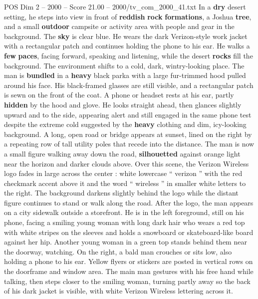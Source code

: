 \begin{textsample}{POS Dim 2 – 2000 – Score 21.00 – 2000/tv\_com\_2000\_41.txt}
In a \textbf{dry} desert setting, he steps into view in front of \textbf{reddish} \textbf{rock} \textbf{formations}, a Joshua \textbf{tree}, and a small \textbf{outdoor} campsite or activity area with people and gear in the background.
The \textbf{sky} is clear blue.
He wears the dark Verizon-style work jacket with a rectangular patch and continues holding the phone to his ear.
He walks a \textbf{few} \textbf{paces}, facing forward, speaking and listening, while the desert \textbf{rocks} fill the background.
The environment shifts to a cold, dark, wintry-looking place.
The man is \textbf{bundled} in a \textbf{heavy} black parka with a large fur-trimmed hood pulled around his face.
His black-framed glasses are still visible, and a rectangular patch is sewn on the front of the coat.
A phone or headset rests at his ear, partly \textbf{hidden} by the hood and glove.
He looks straight ahead, then glances slightly upward and to the side, appearing alert and still engaged in the same phone test despite the extreme cold suggested by the \textbf{heavy} clothing and dim, icy-looking background.
A long, open road or bridge appears at sunset, lined on the right by a repeating row of tall utility poles that recede into the distance.
The man is now a small figure walking away down the road, \textbf{silhouetted} against orange light near the horizon and darker clouds above.
Over this scene, the Verizon Wireless logo fades in large across the center : white lowercase “ verizon ” with the red checkmark accent above it and the word “ wireless ” in smaller white letters to the right.
The background darkens slightly behind the logo while the distant figure continues to stand or walk along the road.
After the logo, the man appears on a city sidewalk outside a storefront.
He is in the left foreground, still on his phone, facing a smiling young woman with long dark hair who wears a red top with white stripes on the sleeves and holds a snowboard or skateboard-like board against her hip.
Another young woman in a green top stands behind them near the doorway, watching.
On the right, a bald man crouches or sits low, also holding a phone to his ear.
Yellow flyers or stickers are posted in vertical rows on the doorframe and window area.
The main man gestures with his free hand while talking, then steps closer to the smiling woman, turning partly away so the back of his dark jacket is visible, with white Verizon Wireless lettering across it.

\end{textsample}
